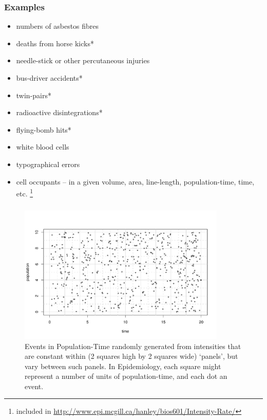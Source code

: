 \documentclass[handout]{beamer}\usepackage[]{graphicx}\usepackage[]{color}
\begin{document}
\begin{frame}
\frametitle{Examples}

\begin{itemize}
\setlength\itemsep{0.5em}
\item numbers of asbestos fibres
\item deaths from horse kicks*
\item needle-stick or other percutaneous injuries
\item bus-driver accidents*
\item twin-pairs*
\item radioactive disintegrations*
\item flying-bomb hits*
\item white blood cells
\item typographical errors
\item cell occupants -- in a given volume, area, line-length, population-time, time, etc. 
\footnote{\footnotesize * included in \url{http://www.epi.mcgill.ca/hanley/bios601/Intensity-Rate/}}
\end{itemize}
\end{frame}



\begin{frame}
\frametitle{}
\begin{figure}[h]
\begin{center}
\includegraphics[width=3.9in,height=2.6in]{DotsinPopulationTime64.pdf}
\caption{Events in Population-Time randomly generated from intensities that are constant within (2 squares high by 2 squares wide) `panels', but vary between such panels. In Epidemiology, each square might represent a number of units of population-time, and each dot an event.}
\end{center}
\end{figure}
\end{frame}
\end{document}
